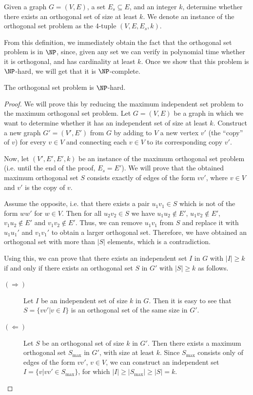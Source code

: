 \documentclass[12pt,a4paper,titlepage,openany]{report}
\begin{document}
\begin{definition}
	Given a graph $G = (V, E)$, a set $E_s \subseteq E$, and an integer $k$, determine whether there exists an orthogonal set of size at least $k$. We denote an instance of the orthogonal set problem as the 4-tuple $(V, E, E_s, k)$.
\end{definition}
From this definition, we immediately obtain the fact that the orthogonal set problem is in $\NP$, since, given any set we can verify in polynomial time whether it is orthogonal, and has cardinality at least $k$. Once we show that this problem is $\NP$-hard, we will get that it is $\NP$-complete.

\begin{theorem}
	The orthogonal set problem is $\NP$-hard.
\end{theorem}
\begin{proof}
	We will prove this by reducing the maximum independent set problem to the maximum orthogonal set problem. Let $G=(V, E)$ be a graph in which we want to determine whether it has an independent set of size at least $k$. Construct a new graph $G'=(V', E')$ from $G$ by adding to $V$ a new vertex $v'$ (the ``copy'' of $v$) for every $v \in V$ and connecting each $v \in V$ to its corresponding copy $v'$. 
	
	Now, let $(V', E', E', k)$ be an instance of the maximum orthogonal set problem (i.e. until the end of the proof, $E_s = E'$). We will prove that the obtained maximum orthogonal set $S$ consists exactly of edges of the form $vv'$, where $v\in V$ and $v'$ is the copy of $v$.
	
	Assume the opposite, i.e. that there exists a pair $u_1v_1 \in S$ which is not of the form $ww'$ for $w \in V$. Then for all $u_2v_2 \in S$ we have $u_1u_2 \notin E'$, $u_1v_2 \notin E'$, $v_1u_2 \notin E'$ and $v_1v_2 \notin E'$. Thus, we can remove $u_1v_1$ from $S$ and replace it with $u_1u_1'$ and $v_1v_1'$ to obtain a larger orthogonal set. Therefore, we have obtained an orthogonal set with more than $|S|$ elements, which is a contradiction.
	
	Using this, we can prove that there exists an independent set $I$ in $G$ with $|I| \geq k$ if and only if there exists an orthogonal set $S$ in $G'$ with $|S| \geq k$ as follows.
	
	\begin{description}
		\item[$(\Rightarrow)$] Let $I$ be an independent set of size $k$ in $G$. Then it is easy to see that $S = \{ vv'| v \in I \}$ is an orthogonal set of the same size in $G'$.
		\item[$(\Leftarrow)$] Let $S$ be an orthogonal set of size $k$ in $G'$. Then there exists a maximum orthogonal set $S_\text{max}$ in $G'$, with size at least $k$. Since $S_\text{max}$ consists only of edges of the form $vv'$, $v \in V$, we can construct an independent set $I = \{ v | vv' \in S_\text{max} \}$, for which $|I| \geq |S_\text{max}| \geq |S| = k$.
	\end{description}


\end{proof}
\end{document}
